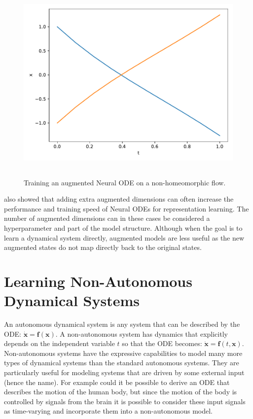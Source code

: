 \documentclass[12pt,a4paper]{book}
\begin{document}
\begin{figure}[H]
    \centering
    \includegraphics[height=10cm]{figs/nonhomeomorphicflows_anode.pdf}
    \caption{Training an augmented Neural ODE on a non-homeomorphic flow.}
    \label{fig:nonhomeomorphicflows_anode}
\end{figure}

\cite{dupont2019augmented} also showed that adding extra augmented dimensions can often increase the performance and training speed of Neural ODEs for representation learning. The number of augmented dimensions can in these cases be considered a hyperparameter and part of the model structure. Although when the goal is to learn a dynamical system directly, augmented models are less useful as the new augmented states do not map directly back to the original states.

\section{Learning Non-Autonomous Dynamical Systems}

An autonomous dynamical system is any system that can be described by the ODE: $\dot{\bm{x}} = \bm{f}(\bm{x})$. A non-autonomous system has dynamics that explicitly depends on the independent variable $t$ so that the ODE becomes: $\dot{\bm{x}} = \bm{f}(t, \bm{x})$. Non-autonomous systems have the expressive capabilities to model many more types of dynamical systems than the standard autonomous systems. They are particularly useful for modeling systems that are driven by some external input (hence the name). For example could it be possible to derive an ODE that describes the motion of the human body, but since the motion of the body is controlled by signals from the brain it is possible to consider these input signals as time-varying and incorporate them into a non-autonomous model.
\end{document}
